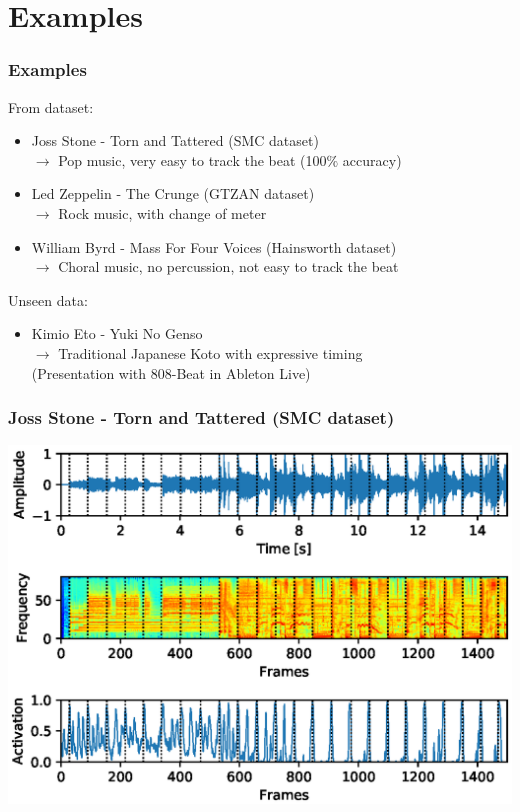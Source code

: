 \documentclass{beamer}
\begin{document}
\section{Examples}

\begin{frame}
\frametitle{Examples}
From dataset:
\begin{itemize}
\item Joss Stone - Torn and Tattered (SMC dataset)  \\ 
$\rightarrow$ Pop music, very easy to track the beat (100$\%$ accuracy)
\item Led Zeppelin - The Crunge (GTZAN dataset) \\ 
$\rightarrow$ Rock music, with change of meter
\item William Byrd - Mass For Four Voices (Hainsworth dataset) \\ 
$\rightarrow$ Choral music, no percussion, not easy to track the beat
\end{itemize}
Unseen data:
\begin{itemize}
\item Kimio Eto - Yuki No Genso  \\ 
$\rightarrow$ Traditional Japanese Koto with expressive timing \\\vspace{0.5em}
(Presentation with 808-Beat in Ableton Live)
\end{itemize}

\end{frame}


\begin{frame}
\frametitle{Joss Stone - Torn and Tattered (SMC dataset)}
\begin{minipage}{\textwidth} 
\centering
\includegraphics[scale=0.6]{figures/joss_stone.eps}
\end{minipage}
\end{frame}
\end{document}

